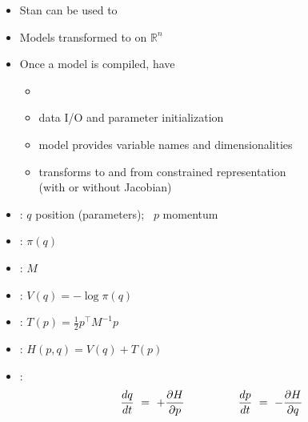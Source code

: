 \documentclass[10pt]{report}
\begin{document}
%
\begin{itemize}
\item Stan can be used to 
\item Models transformed to  on $\mathbb{R}^n$
\item Once a model is compiled, have
  \vspace*{-4pt}
  \begin{itemize}\small
  \item {}
  \item data I/O and parameter initialization
  \item model provides variable names and dimensionalities
  \item transforms to and from constrained representation
    \\ {\footnotesize (with or without Jacobian)}
  \end{itemize}
\end{itemize}





%
\begin{itemize}
\item {}: $q$ position (parameters); \ $p$ momentum
\item {}: $\pi(q)$
\item {}: $M$
\item {}: $V(q) = -\log \pi(q)$
\item {}: $T(p) = \frac{1}{2} p^{\top} M^{-1} p$
\item {}:  $H(p,q) = V(q) + T(p)$
\item {}:
  \[
  \frac{dq}{dt} \ = \  + \frac{\partial H}{\partial p}
  \hspace*{48pt}
  \frac{dp}{dt} \ = \ - \frac{\partial H}{\partial q}
  \]
\end{itemize}
\end{document}
